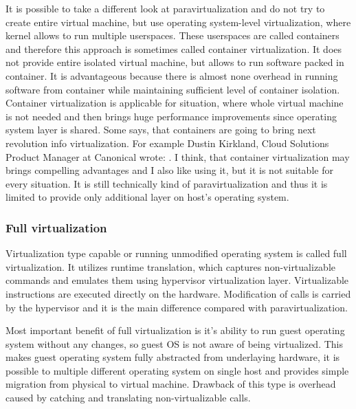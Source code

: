It is possible to take a different look at paravirtualization and do not try to create entire virtual machine, but use operating system-level virtualization, where kernel allows to run multiple userspaces. These userspaces are called containers and therefore this approach is sometimes called container virtualization. It does not provide entire isolated virtual machine, but allows to run software packed in container. It is advantageous because there is almost none overhead in running software from container while maintaining sufficient level of container isolation. Container virtualization is applicable for situation, where whole virtual machine is not needed and then brings huge performance improvements since operating system layer is shared. Some says, that containers are going to bring next revolution info virtualization. For example Dustin Kirkland, Cloud Solutions Product Manager at Canonical wrote:  \cite{ubuntu-docker}. I think, that container virtualization may brings compelling advantages and I also like using it, but it is not suitable for every situation. It is still technically kind of paravirtualization and thus it is limited to provide only additional layer on host's operating system.

\subsubsection{Full virtualization}
Virtualization type capable or running unmodified operating system is called full virtualization. It utilizes runtime translation, which captures non-virtualizable commands and emulates them using hypervisor virtualization layer. Virtualizable instructions are executed directly on the hardware. Modification of  calls is carried by the hypervisor and it is the main difference compared with paravirtualization. 

Most important benefit of full virtualization is it's ability to run guest operating system without any changes, so guest \Ac{OS} is not aware of being virtualized. This makes guest operating system fully abstracted from underlaying hardware, it is possible to multiple different operating system on single host and provides simple migration from physical to virtual machine. Drawback of this type is overhead caused by catching and translating non-virtualizable calls. 


